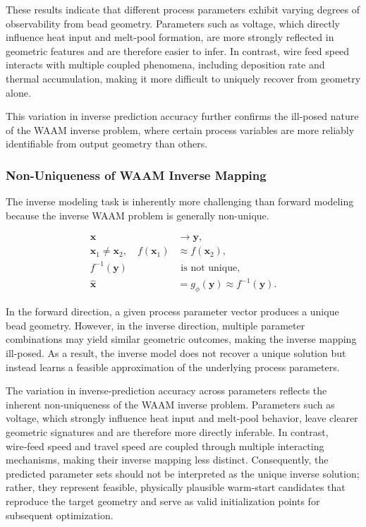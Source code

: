 \documentclass[11pt]{article}
\begin{document}
These results indicate that different process parameters exhibit varying degrees of observability from bead geometry. Parameters such as voltage, which directly influence heat input and melt-pool formation, are more strongly reflected in geometric features and are therefore easier to infer. In contrast, wire feed speed interacts with multiple coupled phenomena, including deposition rate and thermal accumulation, making it more difficult to uniquely recover from geometry alone.

This variation in inverse prediction accuracy further confirms the ill-posed nature of the WAAM inverse problem, where certain process variables are more reliably identifiable from output geometry than others.



\subsubsection{Non-Uniqueness of WAAM Inverse Mapping}


The inverse modeling task is inherently more challenging than forward modeling because the inverse WAAM problem is generally non-unique.

\begin{tcolorbox}[colback=white,colframe=black,boxrule=0.5pt,arc=2pt]
\small
\begin{equation}
\begin{aligned}
\mathbf{x} &\rightarrow \mathbf{y}, \\
\mathbf{x}_{1} \neq \mathbf{x}_{2}, \quad
f(\mathbf{x}_{1}) &\approx f(\mathbf{x}_{2}), \\
f^{-1}(\mathbf{y}) &\text{ is not unique}, \\
\hat{\mathbf{x}} &= g_{\phi}(\mathbf{y}) \approx f^{-1}(\mathbf{y}).
\end{aligned}
\end{equation}
\end{tcolorbox}

In the forward direction, a given process parameter vector produces a unique bead geometry. However, in the inverse direction, multiple parameter combinations may yield similar geometric outcomes, making the inverse mapping ill-posed. As a result, the inverse model does not recover a unique solution but instead learns a feasible approximation of the underlying process parameters.

The variation in inverse‑prediction accuracy across parameters reflects the inherent non‑uniqueness of the WAAM inverse problem. Parameters such as voltage, which strongly influence heat input and melt‑pool behavior, leave clearer geometric signatures and are therefore more directly inferable. In contrast, wire‑feed speed and travel speed are coupled through multiple interacting mechanisms, making their inverse mapping less distinct. Consequently, the predicted parameter sets should not be interpreted as the unique inverse solution; rather, they represent feasible, physically plausible warm‑start candidates that reproduce the target geometry and serve as valid initialization points for subsequent optimization.
\end{document}
